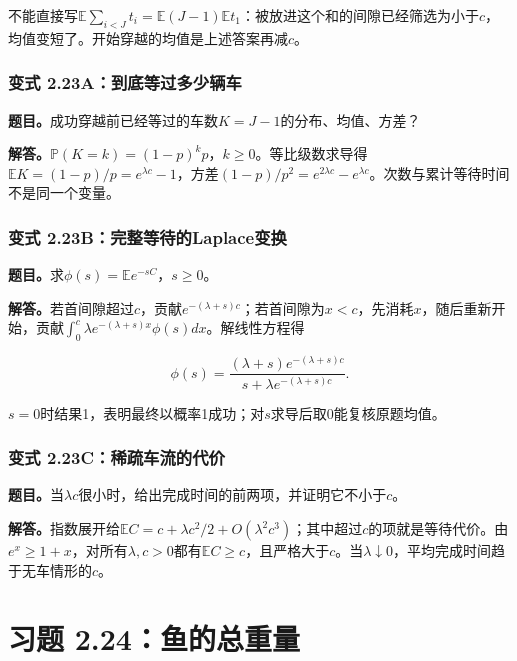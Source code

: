 \documentclass[12pt,a4paper,UTF8,fontset=fandol]{ctexart}
\begin{document}
不能直接写\(\mathbb E\sum_{i<J}t_i=\mathbb E(J-1)\mathbb Et_1\)：被放进这个和的间隙已经筛选为小于\(c\)，均值变短了。开始穿越的均值是上述答案再减\(c\)。

\subsubsection{变式
2.23A：到底等过多少辆车}\label{ux53d8ux5f0f-2.23aux5230ux5e95ux7b49ux8fc7ux591aux5c11ux8f86ux8f66}

\textbf{题目。}成功穿越前已经等过的车数\(K=J-1\)的分布、均值、方差？

\textbf{解答。}\(\mathbb P(K=k)=(1-p)^kp\)，\(k\ge0\)。等比级数求导得\(\mathbb EK=(1-p)/p=e^{\lambda c}-1\)，方差\((1-p)/p^2=e^{2\lambda c}-e^{\lambda c}\)。次数与累计等待时间不是同一个变量。

\subsubsection{变式
2.23B：完整等待的Laplace变换}\label{ux53d8ux5f0f-2.23bux5b8cux6574ux7b49ux5f85ux7684laplaceux53d8ux6362}

\textbf{题目。}求\(\phi(s)=\mathbb Ee^{-sC}\)，\(s\ge0\)。

\textbf{解答。}若首间隙超过\(c\)，贡献\(e^{-(\lambda+s)c}\)；若首间隙为\(x<c\)，先消耗\(x\)，随后重新开始，贡献\(\int_0^c\lambda e^{-(\lambda+s)x}\phi(s)dx\)。解线性方程得

\[\boxed{\phi(s)=\frac{(\lambda+s)e^{-(\lambda+s)c}}{s+\lambda e^{-(\lambda+s)c}}.}\]

\(s=0\)时结果1，表明最终以概率1成功；对\(s\)求导后取0能复核原题均值。

\subsubsection{变式
2.23C：稀疏车流的代价}\label{ux53d8ux5f0f-2.23cux7a00ux758fux8f66ux6d41ux7684ux4ee3ux4ef7}

\textbf{题目。}当\(\lambda c\)很小时，给出完成时间的前两项，并证明它不小于\(c\)。

\textbf{解答。}指数展开给\(\mathbb EC=c+\lambda c^2/2+O(\lambda^2c^3)\)；其中超过\(c\)的项就是等待代价。由\(e^x\ge1+x\)，对所有\(\lambda,c>0\)都有\(\mathbb EC\ge c\)，且严格大于\(c\)。当\(\lambda\downarrow0\)，平均完成时间趋于无车情形的\(c\)。

\section{习题
2.24：鱼的总重量}\label{ux4e60ux9898-2.24ux9c7cux7684ux603bux91cdux91cf}
\end{document}
